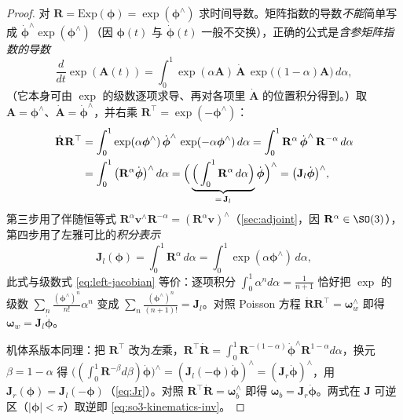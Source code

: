 \begin{proof}
对 $\mathbf{R}=\mathrm{Exp}(\boldsymbol{\phi})=\exp(\boldsymbol{\phi}^\wedge)$ 求时间导数。矩阵指数的导数\emph{不能}简单写成 $\dot{\boldsymbol{\phi}}^\wedge\exp(\boldsymbol{\phi}^\wedge)$（因 $\boldsymbol{\phi}(t)$ 与 $\dot{\boldsymbol{\phi}}(t)$ 一般不交换），正确的公式是\emph{含参矩阵指数的导数}\cite{barfoot2024state}
\begin{equation}
  \frac{d}{dt}\exp(\mathbf{A}(t))=\int_{0}^{1}\exp(\alpha\mathbf{A})\,\dot{\mathbf{A}}\,\exp\big((1-\alpha)\mathbf{A}\big)\,d\alpha,
  \label{eq:matexp-deriv}
\end{equation}
（它本身可由 $\exp$ 的级数逐项求导、再对各项里 $\dot{\mathbf{A}}$ 的位置积分得到。）取 $\mathbf{A}=\boldsymbol{\phi}^\wedge$、$\dot{\mathbf{A}}=\dot{\boldsymbol{\phi}}^\wedge$，并右乘 $\mathbf{R}^\top=\exp(-\boldsymbol{\phi}^\wedge)$：
\begin{align}
  \dot{\mathbf{R}}\mathbf{R}^\top
  &=\int_0^1\exp(\alpha\boldsymbol{\phi}^\wedge)\,\dot{\boldsymbol{\phi}}^\wedge\,\exp(-\alpha\boldsymbol{\phi}^\wedge)\,d\alpha
   =\int_0^1\mathbf{R}^\alpha\,\dot{\boldsymbol{\phi}}^\wedge\,\mathbf{R}^{-\alpha}\,d\alpha\notag\\
  &=\int_0^1\big(\mathbf{R}^\alpha\dot{\boldsymbol{\phi}}\big)^\wedge\,d\alpha
   =\Big(\underbrace{\Big(\int_0^1\mathbf{R}^\alpha\,d\alpha\Big)}_{=\,\mathbf{J}_l}\dot{\boldsymbol{\phi}}\Big)^\wedge
   =\big(\mathbf{J}_l\dot{\boldsymbol{\phi}}\big)^\wedge,
  \label{eq:kinematics-Jl-integral}
\end{align}
第三步用了伴随恒等式 $\mathbf{R}^\alpha\mathbf{v}^\wedge\mathbf{R}^{-\alpha}=(\mathbf{R}^\alpha\mathbf{v})^\wedge$（\cref{sec:adjoint}，因 $\mathbf{R}^\alpha\in\SO(3)$），第四步用了左雅可比的\emph{积分表示}
\begin{equation}
  \mathbf{J}_l(\boldsymbol{\phi})=\int_0^1\mathbf{R}^\alpha\,d\alpha=\int_0^1\exp(\alpha\boldsymbol{\phi}^\wedge)\,d\alpha,
  \label{eq:Jl-integral}
\end{equation}
此式与级数式 \cref{eq:left-jacobian} 等价：逐项积分 $\int_0^1\alpha^n d\alpha=\tfrac{1}{n+1}$ 恰好把 $\exp$ 的级数 $\sum_n\tfrac{(\boldsymbol{\phi}^\wedge)^n}{n!}\alpha^n$ 变成 $\sum_n\tfrac{(\boldsymbol{\phi}^\wedge)^n}{(n+1)!}=\mathbf{J}_l$。对照 Poisson 方程 $\dot{\mathbf{R}}\mathbf{R}^\top=\boldsymbol{\omega}_w^\wedge$ 即得 $\boldsymbol{\omega}_w=\mathbf{J}_l\dot{\boldsymbol{\phi}}$。\par
机体系版本同理：把 $\mathbf{R}^\top$ 改为\emph{左}乘，$\mathbf{R}^\top\dot{\mathbf{R}}=\int_0^1\mathbf{R}^{-(1-\alpha)}\dot{\boldsymbol{\phi}}^\wedge\mathbf{R}^{1-\alpha}d\alpha$，换元 $\beta=1-\alpha$ 得 $\big((\int_0^1\mathbf{R}^{-\beta}d\beta)\dot{\boldsymbol{\phi}}\big)^\wedge=(\mathbf{J}_l(-\boldsymbol{\phi})\dot{\boldsymbol{\phi}})^\wedge=(\mathbf{J}_r\dot{\boldsymbol{\phi}})^\wedge$，用 $\mathbf{J}_r(\boldsymbol{\phi})=\mathbf{J}_l(-\boldsymbol{\phi})$（\cref{eq:Jr}）。对照 $\mathbf{R}^\top\dot{\mathbf{R}}=\boldsymbol{\omega}_b^\wedge$ 即得 $\boldsymbol{\omega}_b=\mathbf{J}_r\dot{\boldsymbol{\phi}}$。两式在 $\mathbf{J}$ 可逆区（$|\boldsymbol{\phi}|<\pi$）取逆即 \cref{eq:so3-kinematics-inv}。\par

\end{proof}
